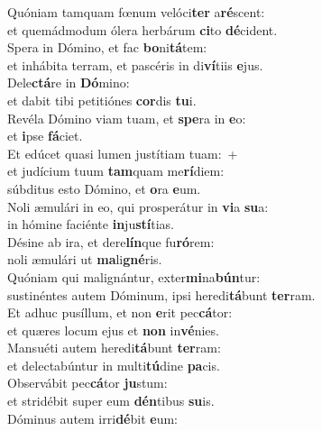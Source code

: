 \evenverse Quóniam tamquam fœnum velóci\textbf{ter} a\textbf{ré}scent:~\*\\
\evenverse et quemádmodum ólera herbárum \textbf{ci}to \textbf{dé}cident.\\
\oddverse Spera in Dómino, et fac \textbf{bo}ni\textbf{tá}tem:~\*\\
\oddverse et inhábita terram, et pascéris in di\textbf{ví}tiis \textbf{e}jus.\\
\evenverse Dele\textbf{ctá}re in \textbf{Dó}mino:~\*\\
\evenverse et dabit tibi petitiónes \textbf{cor}dis \textbf{tu}i.\\
\oddverse Revéla Dómino viam tuam, et \textbf{spe}ra in \textbf{e}o:~\*\\
\oddverse et \textbf{i}pse \textbf{fá}ciet.\\
\evenverse Et edúcet quasi lumen justítiam tuam:~+\\
\evenverse  et judícium tuum \textbf{tam}quam me\textbf{rí}diem:~\*\\
\evenverse súbditus esto Dómino, et \textbf{o}ra \textbf{e}um.\\
\oddverse Noli æmulári in eo, qui prosperátur in \textbf{vi}a \textbf{su}a:~\*\\
\oddverse in hómine faciénte \textbf{in}ju\textbf{stí}tias.\\
\evenverse Désine ab ira, et dere\textbf{lín}que fu\textbf{ró}rem:~\*\\
\evenverse noli æmulári ut \textbf{ma}li\textbf{gné}ris.\\
\oddverse Quóniam qui malignántur, exter\textbf{mi}na\textbf{bún}tur:~\*\\
\oddverse sustinéntes autem Dóminum, ipsi heredi\textbf{tá}bunt \textbf{ter}ram.\\
\evenverse Et adhuc pusíllum, et non \textbf{e}rit pec\textbf{cá}tor:~\*\\
\evenverse et quæres locum ejus et \textbf{non} in\textbf{vé}nies.\\
\oddverse Mansuéti autem heredi\textbf{tá}bunt \textbf{ter}ram:~\*\\
\oddverse et delectabúntur in multi\textbf{tú}dine \textbf{pa}cis.\\
\evenverse Observábit pec\textbf{cá}tor \textbf{ju}stum:~\*\\
\evenverse et stridébit super eum \textbf{dén}tibus \textbf{su}is.\\
\oddverse Dóminus autem irri\textbf{dé}bit \textbf{e}um:~\*\\
